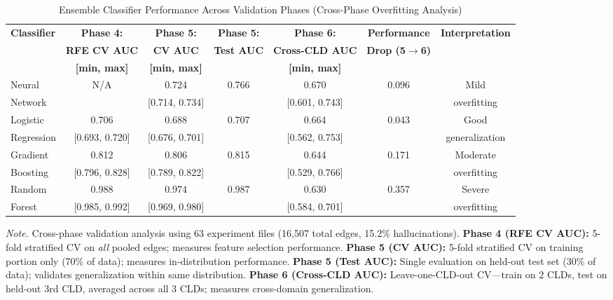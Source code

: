 \documentclass{article}
\begin{document}
\begin{table}[H]
\centering
\caption{Ensemble Classifier Performance Across Validation Phases (Cross-Phase Overfitting Analysis)}
\label{tab:rq2_ensemble_performance}
\begin{threeparttable}
\begin{tabular}{lcccccc}
\toprule
\textbf{Classifier} & \textbf{Phase 4:} & \textbf{Phase 5:} & \textbf{Phase 5:} & \textbf{Phase 6:} & \textbf{Performance} & \textbf{Interpretation} \\
 & \textbf{RFE CV AUC} & \textbf{CV AUC} & \textbf{Test AUC} & \textbf{Cross-CLD AUC} & \textbf{Drop (5$\rightarrow$6)} & \\
 & \textbf{[min, max]} & \textbf{[min, max]} & & \textbf{[min, max]} & & \\
\midrule
Neural             & N/A & 0.724 & 0.766 & 0.670 & 0.096 & Mild \\
Network            & & [0.714, 0.734] & & [0.601, 0.743] & & overfitting \\
\midrule
Logistic           & 0.706 & 0.688 & 0.707 & 0.664 & 0.043 & Good \\
Regression         & [0.693, 0.720] & [0.676, 0.701] & & [0.562, 0.753] & & generalization \\
\midrule
Gradient           & 0.812 & 0.806 & 0.815 & 0.644 & 0.171 & Moderate \\
Boosting           & [0.796, 0.828] & [0.789, 0.822] & & [0.529, 0.766] & & overfitting \\
\midrule
Random             & 0.988 & 0.974 & 0.987 & 0.630 & 0.357 & Severe \\
Forest             & [0.985, 0.992] & [0.969, 0.980] & & [0.584, 0.701] & & overfitting \\
\bottomrule
\end{tabular}
\begin{tablenotes}
\small
\item \textit{Note.} Cross-phase validation analysis using 63 experiment files (16,507 total edges, 15.2\% hallucinations). 
\textbf{Phase 4 (RFE CV AUC):} 5-fold stratified CV on \textit{all} pooled edges; measures feature selection performance.
\textbf{Phase 5 (CV AUC):} 5-fold stratified CV on training portion only (70\% of data); measures in-distribution performance.
\textbf{Phase 5 (Test AUC):} Single evaluation on held-out test set (30\% of data); validates generalization within same distribution.
\textbf{Phase 6 (Cross-CLD AUC):} Leave-one-CLD-out CV---train on 2 CLDs, test on held-out 3rd CLD, averaged across all 3 CLDs; measures cross-domain generalization.

\end{tablenotes}
\end{threeparttable}
\end{table}
\end{document}
